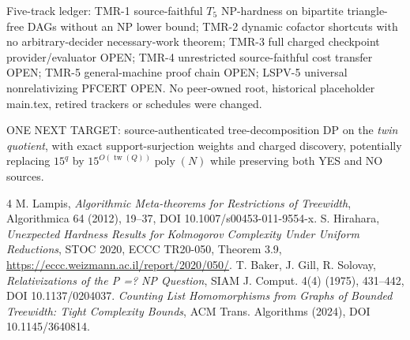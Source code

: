 \documentclass[11pt]{article}
\begin{document}
Five-track ledger: TMR-1 source-faithful $T_5$ NP-hardness on bipartite triangle-free DAGs without an NP lower bound; TMR-2 dynamic cofactor shortcuts with no arbitrary-decider necessary-work theorem; TMR-3 full charged checkpoint provider/evaluator OPEN; TMR-4 unrestricted source-faithful cost transfer OPEN; TMR-5 general-machine proof chain OPEN; LSPV-5 universal nonrelativizing PFCERT OPEN. No peer-owned root, historical placeholder main.tex, retired trackers or schedules were changed.

ONE NEXT TARGET: source-authenticated tree-decomposition DP on the \emph{twin quotient}, with exact support-surjection weights and charged discovery, potentially replacing $15^q$ by $15^{O(\operatorname{tw}(Q))}\operatorname{poly}(N)$ while preserving both YES and NO sources.

\begin{thebibliography}{4}
 M. Lampis, \emph{Algorithmic Meta-theorems for Restrictions of Treewidth}, Algorithmica 64 (2012), 19--37, DOI 10.1007/s00453-011-9554-x.
 S. Hirahara, \emph{Unexpected Hardness Results for Kolmogorov Complexity Under Uniform Reductions}, STOC 2020, ECCC TR20-050, Theorem 3.9, \url{https://eccc.weizmann.ac.il/report/2020/050/}.
 T. Baker, J. Gill, R. Solovay, \emph{Relativizations of the P =? NP Question}, SIAM J. Comput. 4(4) (1975), 431--442, DOI 10.1137/0204037.
 \emph{Counting List Homomorphisms from Graphs of Bounded Treewidth: Tight Complexity Bounds}, ACM Trans. Algorithms (2024), DOI 10.1145/3640814.
\end{thebibliography}
\end{document}
